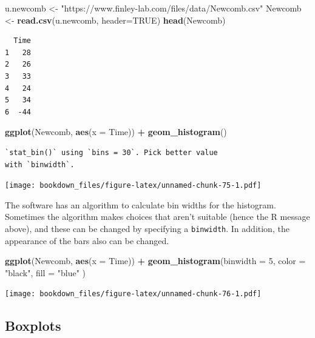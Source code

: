 \documentclass[
]{krantz}
\makeatletter
\newenvironment{Shaded}{\begin{snugshade}}{\end{snugshade}}
\newcommand{\DataTypeTok}[1]{\textcolor[rgb]{0.27,0.27,0.27}{#1}}
\newcommand{\DecValTok}[1]{\textcolor[rgb]{0.06,0.06,0.06}{#1}}
\newcommand{\KeywordTok}[1]{\textcolor[rgb]{0.27,0.27,0.27}{\textbf{#1}}}
\newcommand{\NormalTok}[1]{#1}
\newcommand{\OperatorTok}[1]{\textcolor[rgb]{0.43,0.43,0.43}{\textbf{#1}}}
\newcommand{\OtherTok}[1]{\textcolor[rgb]{0.37,0.37,0.37}{#1}}
\newcommand{\StringTok}[1]{\textcolor[rgb]{0.5,0.5,0.5}{#1}}
\newenvironment{kframe}{%
\medskip{}
\setlength{\fboxsep}{.8em}
 \def\at@end@of@kframe{}%
 \ifinner\ifhmode%
  \def\at@end@of@kframe{\end{minipage}}%
  \begin{minipage}{\columnwidth}%
 \fi\fi%
 \def\FrameCommand##1{\hskip\@totalleftmargin \hskip-\fboxsep
 \colorbox{shadecolor}{##1}\hskip-\fboxsep
     \hskip-\linewidth \hskip-\@totalleftmargin \hskip\columnwidth}%
 \MakeFramed {\advance\hsize-\width
   \@totalleftmargin\z@ \linewidth\hsize
   \@setminipage}}%
 {\par\unskip\endMakeFramed%
 \at@end@of@kframe}
\renewenvironment{Shaded}{\begin{kframe}}{\end{kframe}}
\makeatother
\begin{document}
\begin{Shaded}
\begin{Highlighting}[]
\NormalTok{u.newcomb \textless{}{-}}\StringTok{ "https://www.finley{-}lab.com/files/data/Newcomb.csv"}
\NormalTok{Newcomb \textless{}{-}}\StringTok{ }\KeywordTok{read.csv}\NormalTok{(u.newcomb, }\DataTypeTok{header=}\OtherTok{TRUE}\NormalTok{)}
\KeywordTok{head}\NormalTok{(Newcomb)}
\end{Highlighting}
\end{Shaded}

\begin{verbatim}
  Time
1   28
2   26
3   33
4   24
5   34
6  -44
\end{verbatim}

\begin{Shaded}
\begin{Highlighting}[]
\KeywordTok{ggplot}\NormalTok{(Newcomb, }\KeywordTok{aes}\NormalTok{(}\DataTypeTok{x =}\NormalTok{ Time)) }\OperatorTok{+}\StringTok{ }\KeywordTok{geom\_histogram}\NormalTok{()}
\end{Highlighting}
\end{Shaded}

\begin{verbatim}
`stat_bin()` using `bins = 30`. Pick better value
with `binwidth`.
\end{verbatim}

\texttt{[image: bookdown\_files/figure-latex/unnamed-chunk-75-1.pdf]}

The software has an algorithm to calculate bin widths for the histogram. Sometimes the algorithm makes choices that aren't suitable (hence the R message above), and these can be changed by specifying a \texttt{binwidth}. In addition, the appearance of the bars also can be changed.

\begin{Shaded}
\begin{Highlighting}[]
\KeywordTok{ggplot}\NormalTok{(Newcomb, }\KeywordTok{aes}\NormalTok{(}\DataTypeTok{x =}\NormalTok{ Time)) }\OperatorTok{+}\StringTok{ }
\StringTok{    }\KeywordTok{geom\_histogram}\NormalTok{(}\DataTypeTok{binwidth =} \DecValTok{5}\NormalTok{, }\DataTypeTok{color =} \StringTok{"black"}\NormalTok{, }\DataTypeTok{fill =} \StringTok{"blue"}\NormalTok{ )}
\end{Highlighting}
\end{Shaded}

\texttt{[image: bookdown\_files/figure-latex/unnamed-chunk-76-1.pdf]}

\hypertarget{boxplots}{%
\subsection{Boxplots}\label{boxplots}}
\end{document}
